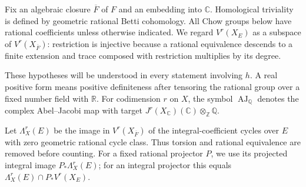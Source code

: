 \documentclass[11pt,a4paper]{article}
\theoremstyle{definition}
\newtheorem{definition}[theorem]{Definition}
\newcommand{\Q}{\mathbb Q}\newcommand{\R}{\mathbb R}\newcommand{\C}{\mathbb C}
\newcommand{\Z}{\mathbb Z}\newcommand{\A}{\mathbb A}\newcommand{\Fbar}{\overline F}
\newcommand{\AJ}{\operatorname{AJ}}\newcommand{\Tr}{\operatorname{Tr}}
\numberwithin{equation}{section}
\begin{document}
Fix an algebraic closure \(\Fbar\) of \(F\) and an embedding into
\(\C\). Homological triviality is defined by geometric rational
Betti cohomology. All Chow groups below have rational coefficients
unless otherwise indicated. We regard \(V^r(X_E)\) as a subspace
of \(V^r(X_{\Fbar})\): restriction is injective because a rational
equivalence descends to a finite extension and trace composed with
restriction multiplies by its degree.


These hypotheses will be understood in every statement involving
\(h\). A real positive form means positive definiteness after
tensoring the rational group over a fixed number field with \(\R\).
For codimension \(r\) on \(X\), the symbol \(\AJ_\Q\)
denotes the complex Abel--Jacobi map with target
\(J^r(X_\C)(\C)\otimes_\Z\Q\).

Let \(\Lambda_X^r(E)\) be the image in \(V^r(X_{\Fbar})\) of the
integral-coefficient cycles over \(E\) with zero geometric rational
cycle class. Thus torsion and rational equivalence are removed before
counting. For a fixed rational projector \(P\), we use its projected
integral image \(P_*\Lambda_X^r(E)\); for an integral projector this
equals \(\Lambda_X^r(E)\cap P_*V^r(X_E)\).
\end{document}
